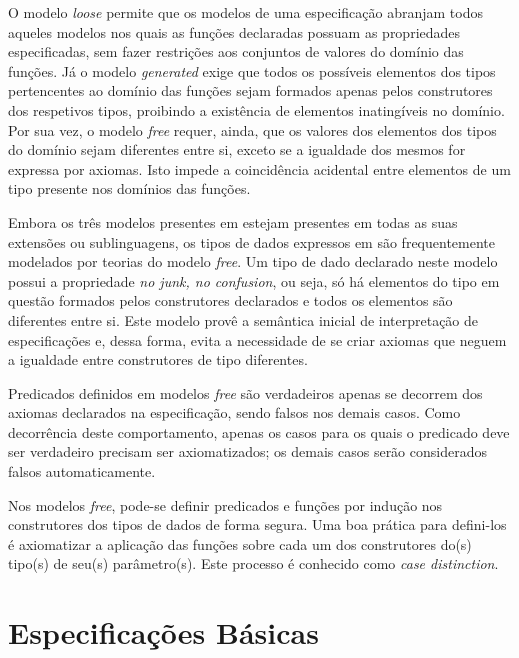 O modelo \textit{loose} permite que os modelos de uma especificação abranjam todos aqueles modelos nos quais as funções declaradas possuam as propriedades especificadas, sem fazer restrições aos conjuntos de valores do domínio das funções.
Já o modelo \textit{generated} exige que todos os possíveis elementos dos tipos pertencentes ao domínio das funções sejam formados apenas pelos construtores dos respetivos tipos, proibindo a existência de elementos inatingíveis no domínio.
Por sua vez, o modelo \textit{free} requer, ainda, que os valores dos elementos dos tipos do domínio sejam diferentes entre si, exceto se a igualdade dos mesmos for expressa por axiomas.
Isto impede a coincidência acidental entre elementos de um tipo presente nos domínios das funções.

Embora os três modelos presentes em \CASL estejam presentes em todas as suas extensões ou sublinguagens, os tipos de dados expressos em \HasCASL são frequentemente modelados por teorias do modelo \textit{free}.
Um tipo de dado declarado neste modelo possui a propriedade \textit{no junk, no confusion}, ou seja, só há elementos do tipo em questão formados pelos construtores declarados e todos os elementos são diferentes entre si.
Este modelo provê a semântica inicial de interpretação de especificações e, dessa forma, evita a necessidade de se criar axiomas que neguem a igualdade entre construtores de tipo diferentes.

Predicados definidos em modelos \textit{free} são verdadeiros apenas se decorrem dos axiomas declarados na especificação, sendo falsos nos demais casos.
Como decorrência deste comportamento, apenas os casos para os quais o predicado deve ser verdadeiro precisam ser axiomatizados; os demais casos serão considerados falsos automaticamente.

Nos modelos \textit{free}, pode-se definir predicados e funções por indução nos construtores dos tipos de dados de forma segura. Uma boa prática para defini-los é axiomatizar a aplicação das  funções sobre cada um dos construtores do(s) tipo(s) de seu(s) parâmetro(s). Este processo é conhecido como \textit{case distinction}.

\section{Especificações Básicas}
\label{sec:basicspec}


